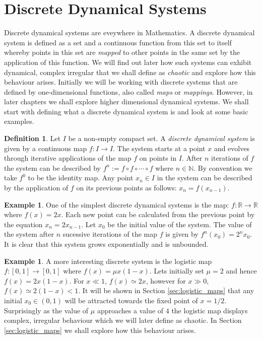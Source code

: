 \documentclass[11pt,a4paper,oneside]{memoir}
\theoremstyle{plain}
\theoremstyle{definition}
\newtheorem{defn}[thm]{Definition}
\newtheorem{exmp}[thm]{Example}
\begin{document}
\section{Discrete Dynamical Systems} \label{sec:dynsys}

Discrete dynamical systems are eveywhere in Mathematics. A discrete dynamical system is defined as a set and a continuous function from this set to itself whereby points in this set are \emph{mapped} to other points in the same set by the application of this function. We will find out later how such systems can exhibit dynamical, complex irregular that we shall define as \emph{chaotic} and explore how this behaviour arises. Initially we will be working with discrete systems that are defined by one-dimensional functions, also called \emph{maps} or \emph{mappings}. However, in later chapters we shall explore higher dimensional dynamical systems. We shall start with defining what a discrete dynamical system is and look at some basic examples.

\begin{defn}
    Let $I$ be a non-empty compact set. A \emph{discrete dynamical system} is given by a continuous map $f: I \to I$. The system starts at a point $x$ and evolves through iterative applications of the map $f$ on points in $I$. After $n$ iterations of $f$ the system can be described by $f^n := f \circ f \circ \cdots \circ f$ where $n \in \mathbb{N}$. By convention we take $f^0$ to be the identity map. Any point $x_n \in I$ in the system can be described by the application of $f$ on its previous points as follows: $x_n = f(x_{n-1})$.
\end{defn}

\begin{exmp}
    One of the simplest discrete dynamical systems is the map: $f: \mathbb{R} \to \mathbb{R}$ where $f(x) = 2x$. Each new point can be calculated from the previous point by the equation $x_n = 2x_{n-1}$. Let $x_0$ be the initial value of the system. The value of the system after $n$ sucessive iterations of the map $f$ is given by $f^n(x_0) = 2^nx_0$. It is clear that this system grows exponentially and is unbounded.
\end{exmp}

\begin{exmp}
    A more interesting discrete system is the logistic map $f: [0,1] \to [0,1]$ where $f(x)=\mu x(1-x)$. Lets initially set $\mu = 2$ and hence $f(x) = 2x(1-x)$. For $x \ll 1$, $f(x) \simeq 2x$, however for $x \gg 0$, $f(x) \simeq 2(1-x) < 1$. It will be shown in Section \ref{sec:logistic_maps} that any initial $x_0 \in (0, 1)$ will be attracted towards the fixed point of $x = 1/2$. Surprisingly as the value of $\mu$ approaches a value of $4$ the logistic map displays complex, irregular behaviour which we will later define as chaotic. In Section \ref{sec:logistic_maps} we shall explore how this behaviour arises.
\end{exmp}
\end{document}
